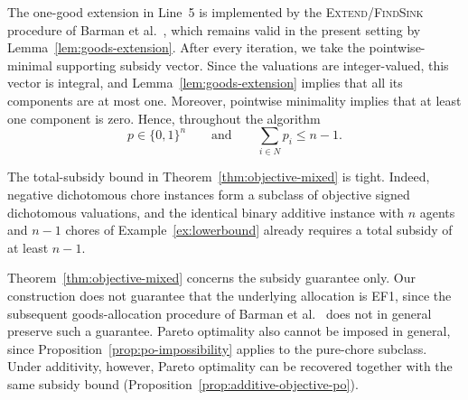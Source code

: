 The one-good extension in Line~5 is implemented by the
\textsc{Extend}/\textsc{FindSink} procedure of Barman et al.~\cite{BKNS22}, which
remains valid in the present setting by Lemma~\ref{lem:goods-extension}. After
every iteration, we take the pointwise-minimal supporting subsidy vector. Since
the valuations are integer-valued, this vector is integral, and
Lemma~\ref{lem:goods-extension} implies that all its components are at most one.
Moreover, pointwise minimality implies that at least one component is zero.
Hence, throughout the algorithm
\[
  p\in\{0,1\}^n
  \qquad\text{and}\qquad
  \sum_{i\in N}p_i\le n-1.
\]

The total-subsidy bound in Theorem~\ref{thm:objective-mixed} is tight. Indeed,
negative dichotomous chore instances form a subclass of objective signed
dichotomous valuations, and the identical binary additive instance with $n$
agents and $n-1$ chores of Example~\ref{ex:lowerbound} already requires a total
subsidy of at least $n-1$.

Theorem~\ref{thm:objective-mixed} concerns the subsidy guarantee only. Our
construction does not guarantee that the underlying allocation is EF1, since the
subsequent goods-allocation procedure of Barman et al.~\cite{BKNS22} does not in
general preserve such a guarantee. Pareto optimality also cannot be imposed in
general, since Proposition~\ref{prop:po-impossibility} applies to the pure-chore
subclass. Under additivity, however, Pareto optimality can be recovered together
with the same subsidy bound (Proposition~\ref{prop:additive-objective-po}).
